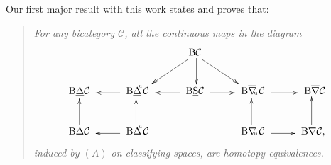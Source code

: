 \documentclass[]{amsart}
\begin{document}
Our first major result with this work states and proves that: \begin{quote}{\em For any bicategory
${\ensuremath{\mathcal{C}}}$, all the continuous maps in the diagram
$$
\xymatrix{&&\ \  {\ensuremath{\mathrm{B}}}{\ensuremath{\mathcal{C}}} \ar@<1.5pt>[d]\ar@<1.5pt>[dl]\ \ \ar@<-1.5pt>[dr]&&\\ {\ensuremath{\mathrm{B}}}{\ensuremath{\underline{\Delta}}}{\ensuremath{\mathcal{C}}}\ &
\ar@<1.5pt>[l]\ {\ensuremath{\mathrm{B}}}{\ensuremath{\underline{\Delta}}}\hspace{-3pt}^{^\mathrm{u}}{\ensuremath{\mathcal{C}}}\ &  \ar@<1.5pt>[l]\
{\ensuremath{\mathrm{B}}}\underline{\mathrm{S}}{\ensuremath{\mathcal{C}}} \ \ar@<-1.5pt>[r] &\
{\ensuremath{\mathrm{B}}}\overline{\nabla}\hspace{-2.5pt}_{^{_\mathrm{u}}}{\ensuremath{\mathcal{C}}}\  \ar@<-1.5pt>[r]& \
{\ensuremath{\mathrm{B}}}\overline{\nabla}{\ensuremath{\mathcal{C}}}
\\ \ar@<1.5pt>[u]{\ensuremath{\mathrm{B}}}{\ensuremath{\Delta}}{\ensuremath{\mathcal{C}}}\
&\ar@<1.5pt>[l]\ {\ensuremath{\mathrm{B}}}{\ensuremath{\Delta}}\hspace{-3pt}^{^\mathrm{u}}{\ensuremath{\mathcal{C}}} \ \ar@<1.5pt>[u] &&\
{\ensuremath{\mathrm{B}}}\nabla\hspace{-2.5pt}_{^{_\mathrm{u}}}{\ensuremath{\mathcal{C}}} \ \ar@<1.5pt>[u] \ar@<-1.5pt>[r] & \ {\ensuremath{\mathrm{B}}}\nabla{\ensuremath{\mathcal{C}}},
\ \ar@<1.5pt>[u]}
$$
induced by $(A)$ on classifying spaces, are homotopy equivalences.} \end{quote}
\end{document}
